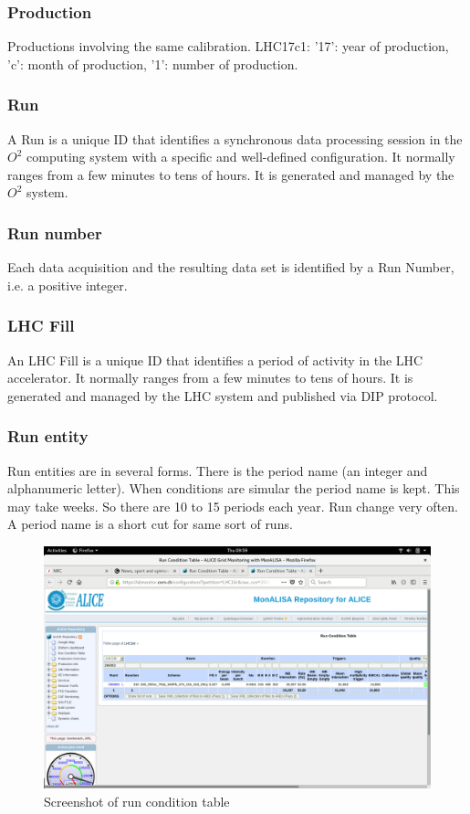 \subsubsection{Production}
Productions involving the same calibration. LHC17c1: '17': year of production, 'c': month of production, '1': number of production.

\subsubsection{Run}
A Run is a unique ID that identifies a synchronous data processing session in the $O^2$ computing system with a specific and well-defined configuration. It normally ranges from a few minutes to tens of hours. It is generated and managed by the $O^2$ system. 

\subsubsection{Run number}
Each data acquisition and the resulting data set is identified by a Run Number, i.e. a positive integer.

\subsubsection{LHC Fill}
An LHC Fill is a unique ID that identifies a period of activity in the LHC accelerator. It normally ranges from a few minutes to tens of hours. It is generated and managed by the LHC system and published via DIP protocol. 

\subsubsection{Run entity}
Run entities are in several forms. There is the period name (an integer and alphanumeric letter). When conditions are simular the period name is kept. This may take weeks. So there are 10 to 15 periods each year. Run change very often. A period name is a short cut for same sort of runs.
\begin{figure}
  \begin{center}
    \includegraphics[scale=0.15]{./images/run_entity.png}
    \caption{Screenshot of run condition table}
    \label{fig:run_con_table}
  \end{center}
\end{figure}

